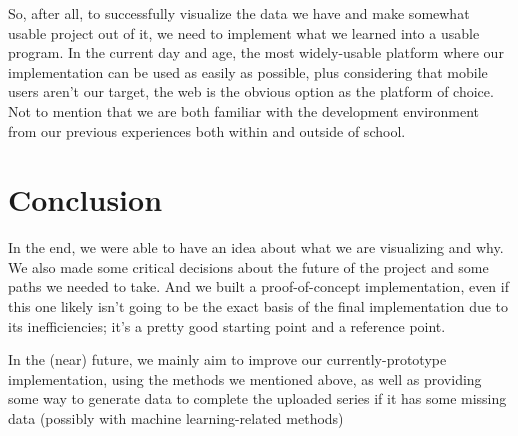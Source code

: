 \documentclass[11pt]{article}
\begin{document}

So, after all, to successfully visualize the data we have and make somewhat usable project out of it, we need to implement what we learned into a usable program. In the current day and age, the most widely-usable platform where our implementation can be used as easily as possible, plus considering that mobile users aren't our target, the web is the obvious option as the platform of choice. Not to mention that we are both familiar with the development environment from our previous experiences both within and outside of school.

\section {Conclusion} 

In the end, we were able to have an idea about what we are visualizing and why. We also made some critical decisions about the future of the project and some paths we needed to take. And we built a proof-of-concept implementation, even if this one likely isn't going to be the exact basis of the final implementation due to its inefficiencies; it's a pretty good starting point and a reference point.

In the (near) future, we mainly aim to improve our currently-prototype implementation, using the methods we mentioned above, as well as providing some way to generate data to complete the uploaded series if it has some missing data (possibly with machine learning-related methods)
\end{document}
